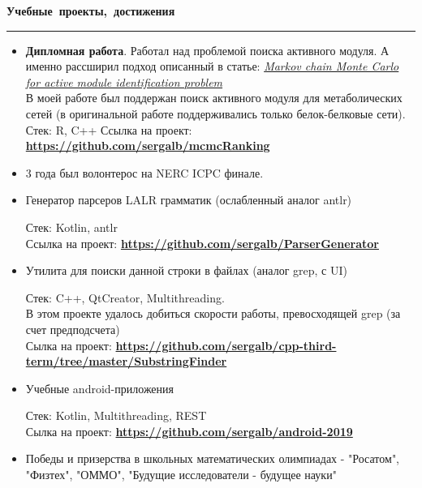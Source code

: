 \documentclass[12pt, a4paper]{report}
\begin{document}
    \par\hbox{\large\textbf{Учебные проекты, достижения}}\kern5pt\hrule\kern5pt
    \begin{itemize}

        \item \textbf{Дипломная работа}. Работал над проблемой поиска активного модуля. А именно рассширил подход описанный в статье: \href{https://bmcbioinformatics.biomedcentral.com/articles/10.1186/s12859-020-03572-9}{\textit{Markov chain Monte Carlo for active module identification problem}}\\
        В моей работе был поддержан поиск активного модуля для метаболических сетей (в оригинальной работе поддерживались только белок-белковые сети).\\
        Стек: R, C++
        Ссылка на проект:
        \textbf{
            \url{https://github.com/sergalb/mcmcRanking}
        }

        \item 3 года был волонтерос на NERC ICPC финале.

        \item Генератор парсеров LALR грамматик (ослабленный аналог antlr)

        Стек: Kotlin, antlr\\
        Ссылка на проект:
        \textbf{
        \url{https://github.com/sergalb/ParserGenerator}
        }

        \item Утилита для поиски данной строки в файлах (аналог grep, с UI)

        Стек: C++, QtCreator, Multithreading.\\
        В этом проекте удалось добиться скорости работы, превосходящей grep (за счет предподсчета)\\
        Сылка на проект:
        \textbf{
        \url{https://github.com/sergalb/cpp-third-term/tree/master/SubstringFinder}
        }

        \item Учебные android-приложения

        Стек: Kotlin, Multithreading, REST\\
        Сылка на проект:
        \textbf{
        \url{https://github.com/sergalb/android-2019}
        }

        \item Победы и призерства в школьных математических олимпиадах - "Росатом", "Физтех", "ОММО", "Будущие исследователи - будущее науки"

    \end{itemize}
\end{document}
